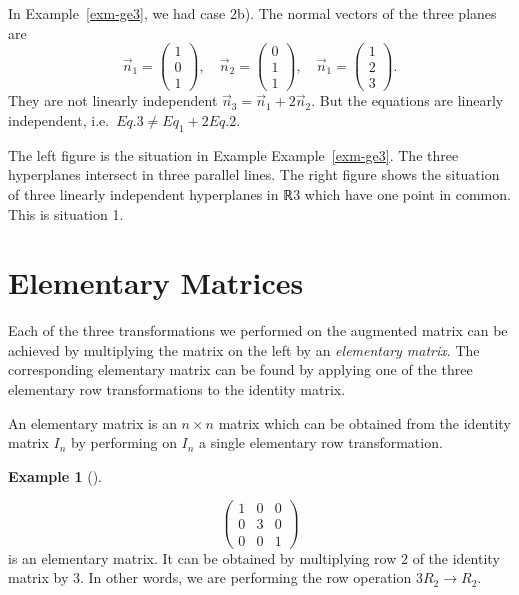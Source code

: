\documentclass[
  a4paper,
  DIV=11,
  numbers=noendperiod,
  oneside]{scrreprt}
\theoremstyle{definition}
\newtheorem{example}{Example}[chapter]
\theoremstyle{remark}
\newenvironment{fbxSimple}[3]{\begin{tcolorbox}[enhanced, breakable,%
attach boxed title to top*={xshift=1.4pt},
boxed title style={boxrule=0.0mm, fuzzy shadow={1pt}{-1pt}{0mm}{0.1mm}{gray}, arc=.3em, rounded corners=east, sharp corners=west}, colframe=#1-color2, colbacktitle=#1-color1, colback = white, coltitle=black,  titlerule=0mm, toprule=0pt, bottomrule=.7pt, leftrule=.3em, rightrule=.7pt, outer arc=.3em,  	left=.5em, right=.5em, bottomtitle=1mm, toptitle=1mm,title=\textbf{#2}\hspace{0.5em}{#3}]}
{\end{tcolorbox}}
\begin{document}
\begin{tcolorbox}
In Example~\ref{exm-ge3}, we had case 2b). The normal vectors of the
three planes are
\[\vec{n}_{1} = \scriptscriptstyle \begin{pmatrix}   1 \\ 0 \\ 1  \end{pmatrix} \textstyle, \quad \vec{n}_{2} = \scriptscriptstyle \begin{pmatrix}   0 \\ 1 \\ 1  \end{pmatrix} \textstyle, \quad \vec{n}_{1} = \scriptscriptstyle \begin{pmatrix}   1 \\ 2 \\ 3  \end{pmatrix} \textstyle .\]
They are not linearly independent
\(\vec{n}_{3} = \vec{n}_{1} +2 \vec{n}_{2}\). But the equations are
linearly independent, i.e.~\(Eq. 3 \neq Eq_{1} + 2 Eq. 2\).

The left figure is the situation in Example Example~\ref{exm-ge3}. The
three hyperplanes intersect in three parallel lines. The right figure
shows the situation of three linearly independent hyperplanes in {ℝ3}
which have one point in common. This is situation 1.

\end{tcolorbox}

\section{Elementary Matrices}\label{elementary-matrices}

Each of the three transformations we performed on the augmented matrix
can be achieved by multiplying the matrix on the left by an
\emph{elementary matrix}. The corresponding elementary matrix can be
found by applying one of the three elementary row transformations to the
identity matrix.

\label{Definition-3.12}
\begin{fbxSimple}{Definition}{Definition 3.12}{}
\label{Definition-3.12}
An elementary matrix is an \(n\times n\) matrix which can be obtained
from the identity matrix \(I_{n}\) by performing on \(I_{n}\) a single
elementary row transformation.

\end{fbxSimple}

\begin{example}[]\protect\hypertarget{exm-}{}\label{exm-}

\[\left(\begin{array}{ccc}1 & 0 & 0 \\ 0 & 3 & 0 \\ 0 & 0 & 1\end{array}\right)\]
is an elementary matrix. It can be obtained by multiplying row \(2\) of
the identity matrix by \(3\). In other words, we are performing the row
operation \(3R_{2}\rightarrow R_{2}\).

\end{example}
\end{document}
